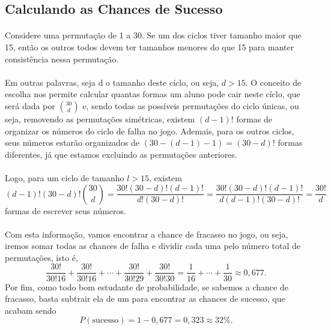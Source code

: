 \documentclass{article}
\begin{document}
    \newpage
    \subsection{Calculando as Chances de Sucesso}    

        \paragraph{}Considere uma permuta\c c\~ao de 1 a 30. Se um dos ciclos tiver tamanho maior que 15, ent\~ao os outros todos devem ter tamanhos menores do que 15 para manter
        consist\^encia nessa permuta\c c\~ao. 
        
        \paragraph{}Em outras palavras, seja d o tamanho deste c\'iclo, ou seja, $d > 15$. O conceito de escolha nos permite calcular quantas 
        formas um aluno pode cair neste c\'iclo, que ser\'a dada por $\binom{30}{d}$ e, sendo todas as poss\'iveis permuta\c c\~oes do ciclo \'unicas, ou seja, removendo
        as permuta\c c\~oes sim\'etricas, existem $(d-1)!$ formas de organizar os n\'umeros do ciclo de falha no jogo. Ademais, para os outros ciclos, seus n\'umeros estar\~ao
        organizados de $(30 - (d - 1) - 1) = (30 - d)!$ formas diferentes, j\'a que estamos excluindo as permuta\c c\~oes anteriores.

        \paragraph{}Logo, para um ciclo de tamanho $l > 15$, existem 
        $$
        (d-1)!(30-d)!\binom{30}{d} = \frac{30!(30-d)!(d-1)!}{d!(30-d)!} = \frac{30!(30-d)!(d-1)!}{d(d-1)!(30-d)!} = \frac{30!}{d}
        $$
        formas de escrever seus n\'umeros. 

        \paragraph{}Com esta informa\c c\~ao, vamos encontrar a chance de fracasso no jogo, ou seja, iremos somar todas as chances de falha e dividir cada uma pelo n\'umero total
        de permuta\c c\~oes, isto \'e, 
        $$
            \frac{30!}{30!16} + \frac{30!}{30!16} + \cdots + \frac{30!}{30!29} + \frac{30!}{30!30} = \frac{1}{16} + \cdots + \frac{1}{30} \approx 0,677.
        $$
        Por fim, como todo bom estudante de probabilidade, se sabemos a chance de fracasso, basta subtrair ela de um para encontrar as chances de sucesso, que acabam sendo
        $$
            P(\text{sucesso}) = 1 - 0,677 = 0,323 \approx 32\%.
        $$
\end{document}
